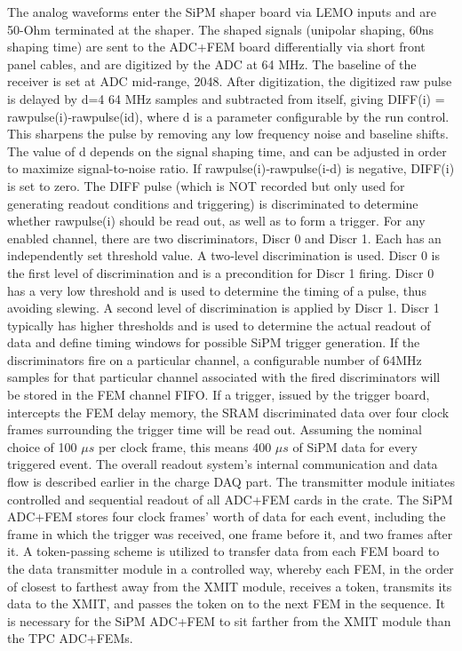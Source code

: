 \documentclass[a4paper,fleqn,longmktitle]{cas-dc}
\begin{document}
The analog waveforms enter the SiPM shaper board via LEMO inputs and are 50-Ohm terminated at the shaper. The shaped signals (unipolar shaping, 60ns shaping time) are sent to the ADC+FEM board differentially via short front panel cables, and are digitized by the ADC at 64 MHz. The baseline of the receiver is set at ADC mid‐range, 2048. After digitization, the digitized raw pulse is delayed by d=4 64 MHz samples and subtracted from itself, giving DIFF(i) = rawpulse(i)‐rawpulse(id), where d is a parameter configurable by the run control. This sharpens the pulse by removing any low frequency noise and baseline shifts. The value of d depends on the signal shaping time, and can be adjusted in order to maximize signal-to-noise ratio. If rawpulse(i)‐rawpulse(i‐d) is negative, DIFF(i) is set to zero. The DIFF pulse (which is NOT recorded but only used for generating readout conditions and triggering) is discriminated to determine whether rawpulse(i) should be read out, as well as to form a trigger. For any enabled channel, there are two discriminators, Discr 0 and Discr 1. Each has an independently set threshold value. A two‐level discrimination is used. Discr 0 is the first level of discrimination and is a precondition for Discr 1 firing. Discr 0 has a very low threshold and is used to determine the timing of a pulse, thus avoiding slewing. A second level of discrimination is applied by Discr 1. Discr 1 typically has higher thresholds and is used to determine the actual readout of data and define timing windows for possible SiPM trigger generation. If the discriminators fire on a particular channel, a configurable number of 64MHz samples for that particular channel associated with the fired discriminators will be stored in the FEM channel FIFO. If a trigger, issued by the trigger board, intercepts the FEM delay memory, the SRAM discriminated data over four clock frames surrounding the trigger time will be read out. Assuming the nominal choice of 100 $ \mu s$ per clock frame, this means 400 $ \mu s$ of SiPM data for every triggered event. The overall readout system's internal communication and data flow is described earlier in the charge DAQ part. The transmitter module initiates controlled and sequential readout of all ADC+FEM cards in the crate. The SiPM ADC+FEM stores four clock frames' worth of data for each event, including the frame in which the trigger was received, one frame before it, and two frames after it. A token-passing scheme is utilized to transfer data from each FEM board to the data transmitter module in a controlled way, whereby each FEM, in the order of closest to farthest away from the XMIT module, receives a token, transmits its data to the XMIT, and passes the token on to the next FEM in the sequence. It is necessary for the SiPM ADC+FEM to sit farther from the XMIT module than the TPC ADC+FEMs.
\end{document}
